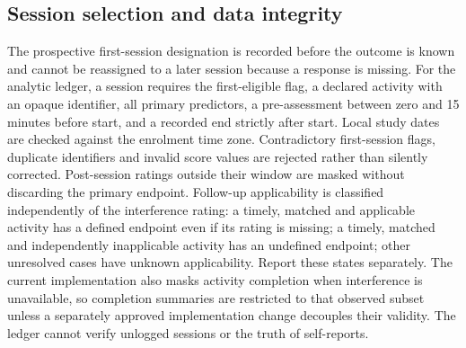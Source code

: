\documentclass[11pt]{article}
\begin{document}
\subsection{Session selection and data integrity}
The prospective first-session designation is recorded before the outcome is known and cannot be reassigned to a later session because a response is missing. For the analytic ledger, a session requires the first-eligible flag, a declared activity with an opaque identifier, all primary predictors, a pre-assessment between zero and 15 minutes before start, and a recorded end strictly after start. Local study dates are checked against the enrolment time zone. Contradictory first-session flags, duplicate identifiers and invalid score values are rejected rather than silently corrected. Post-session ratings outside their window are masked without discarding the primary endpoint. Follow-up applicability is classified independently of the interference rating: a timely, matched and applicable activity has a defined endpoint even if its rating is missing; a timely, matched and independently inapplicable activity has an undefined endpoint; other unresolved cases have unknown applicability. Report these states separately. The current implementation also masks activity completion when interference is unavailable, so completion summaries are restricted to that observed subset unless a separately approved implementation change decouples their validity. The ledger cannot verify unlogged sessions or the truth of self-reports.
\end{document}
